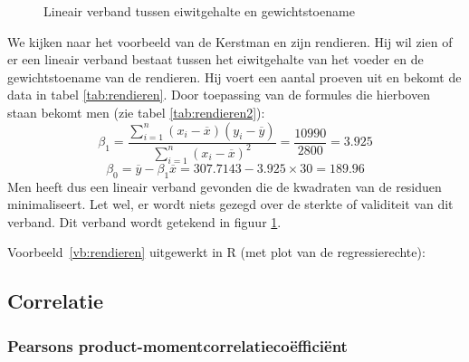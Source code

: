 \begin{figure}

  \caption{Lineair verband tussen eiwitgehalte en gewichtstoename}
  \label{fig:rendierenFiguur}
\end{figure}

\begin{example}
  \label{vb:rendieren}
  We kijken naar het voorbeeld van de Kerstman en zijn rendieren. Hij wil zien of er een lineair verband bestaat tussen het eiwitgehalte van het voeder en de gewichtstoename van de rendieren. Hij voert een aantal proeven uit en bekomt de data in tabel \ref{tab:rendieren}. Door toepassing van de formules die hierboven staan bekomt men (zie tabel \ref{tab:rendieren2}):
  \[ \beta_{1} = \frac{\sum_{i=1}^{n} (x_{i}-\overline{x})(y_{i} - \overline{y})}{\sum_{i=1}^{n} (x_{i}-\overline{x})^{2}} = \frac{10990}{2800} = 3.925 \]
  \[ \beta_{0} = \overline{y} - \beta_{1} \overline{x} = 307.7143 - 3.925 \times 30 = 189.96 \]
  Men heeft dus een lineair verband gevonden die de kwadraten van de residuen minimaliseert. Let wel, er wordt niets gezegd over de sterkte of validiteit van dit verband. Dit verband wordt getekend in figuur \ref{fig:rendierenFiguur}.
\end{example}

Voorbeeld~\ref{vb:rendieren} uitgewerkt in R (met plot van de regressierechte):



\subsection{Correlatie}
\label{sec:correlatie}

\subsubsection{Pearsons product-momentcorrelatiecoëfficiënt}

